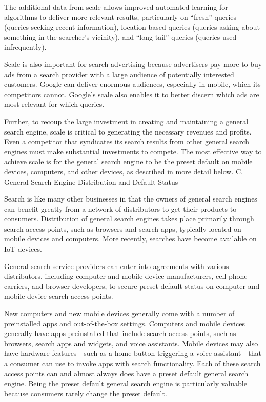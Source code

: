 \documentclass[11pt,b5paper]{scrartcl}
\begin{document}

The additional data from scale allows improved automated learning for algorithms
to deliver more relevant results, particularly on “fresh” queries (queries seeking recent
information), location-based queries (queries asking about something in the searcher’s vicinity),
and “long-tail” queries (queries used infrequently).


Scale is also important for search advertising because advertisers pay more to buy
ads from a search provider with a large audience of potentially interested customers. Google can
deliver enormous audiences, especially in mobile, which its competitors cannot. Google’s scale
also enables it to better discern which ads are most relevant for which queries.


Further, to recoup the large investment in creating and maintaining a general
search engine, scale is critical to generating the necessary revenues and profits. Even a
competitor that syndicates its search results from other general search engines must make
substantial investments to compete. The most effective way to achieve scale is for the general
search engine to be the preset default on mobile devices, computers, and other devices, as
described in more detail below.
C.
General Search Engine Distribution and Default Status


Search is like many other businesses in that the owners of general search engines
can benefit greatly from a network of distributors to get their products to consumers. Distribution
of general search engines takes place primarily through search access points, such as browsers
and search apps, typically located on mobile devices and computers. More recently, searches
have become available on IoT devices.


General search service providers can enter into agreements with various
distributors, including computer and mobile-device manufacturers, cell phone carriers, and
browser developers, to secure preset default status on computer and mobile-device search access
points.


New computers and new mobile devices generally come with a number of
preinstalled apps and out-of-the-box settings. Computers and mobile devices generally have apps
preinstalled that include search access points, such as browsers, search apps and widgets, and
voice assistants. Mobile devices may also have hardware features—such as a home button
triggering a voice assistant—that a consumer can use to invoke apps with search functionality.
Each of these search access points can and almost always does have a preset default general
search engine. Being the preset default general search engine is particularly valuable because
consumers rarely change the preset default.
\end{document}
